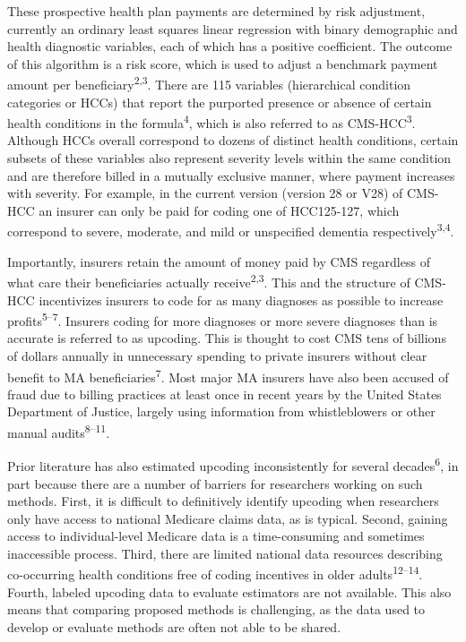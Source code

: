 \documentclass[
  12pt,
  number]{elsarticle}
\begin{document}
These prospective health plan payments are determined by risk
adjustment, currently an ordinary least squares linear regression with
binary demographic and health diagnostic variables, each of which has a
positive coefficient. The outcome of this algorithm is a risk score,
which is used to adjust a benchmark payment amount per
beneficiary\textsuperscript{2,3}. There are 115 variables (hierarchical
condition categories or HCCs) that report the purported presence or
absence of certain health conditions in the formula\textsuperscript{4},
which is also referred to as CMS-HCC\textsuperscript{3}. Although HCCs
overall correspond to dozens of distinct health conditions, certain
subsets of these variables also represent severity levels within the
same condition and are therefore billed in a mutually exclusive manner,
where payment increases with severity. For example, in the current
version (version 28 or V28) of CMS-HCC an insurer can only be paid for
coding one of HCC125-127, which correspond to severe, moderate, and mild
or unspecified dementia respectively\textsuperscript{3,4}.

Importantly, insurers retain the amount of money paid by CMS regardless
of what care their beneficiaries actually receive\textsuperscript{2,3}.
This and the structure of CMS-HCC incentivizes insurers to code for as
many diagnoses as possible to increase profits\textsuperscript{5--7}.
Insurers coding for more diagnoses or more severe diagnoses than is
accurate is referred to as upcoding. This is thought to cost CMS tens of
billions of dollars annually in unnecessary spending to private insurers
without clear benefit to MA beneficiaries\textsuperscript{7}. Most major
MA insurers have also been accused of fraud due to billing practices at
least once in recent years by the United States Department of Justice,
largely using information from whistleblowers or other manual
audits\textsuperscript{8--11}.

Prior literature has also estimated upcoding inconsistently for several
decades\textsuperscript{6}, in part because there are a number of
barriers for researchers working on such methods. First, it is difficult
to definitively identify upcoding when researchers only have access to
national Medicare claims data, as is typical. Second, gaining access to
individual-level Medicare data is a time-consuming and sometimes
inaccessible process. Third, there are limited national data resources
describing co-occurring health conditions free of coding incentives in
older adults\textsuperscript{12--14}. Fourth, labeled upcoding data to
evaluate estimators are not available. This also means that comparing
proposed methods is challenging, as the data used to develop or evaluate
methods are often not able to be shared.
\end{document}
